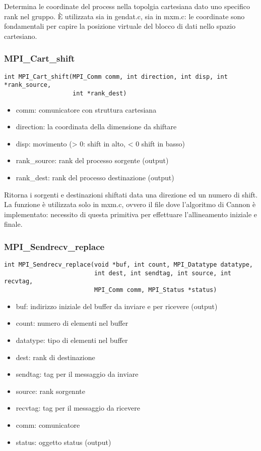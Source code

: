 Determina le coordinate del process nella topolgia cartesiana dato uno specifico rank nel gruppo. \`{E} utilizzata sia in gendat.c, sia in mxm.c: le coordinate sono fondamentali per capire la posizione virtuale del blocco di dati nello spazio cartesiano.

\subsubsection{MPI\_Cart\_shift}
\begin{lstlisting}
int MPI_Cart_shift(MPI_Comm comm, int direction, int disp, int *rank_source,
                   int *rank_dest)
\end{lstlisting}
\begin{itemize}
  \item comm: comunicatore con struttura cartesiana
  \item direction: la coordinata della dimensione da shiftare
  \item disp: movimento (> 0: shift in alto, < 0 shift in basso)
  \item rank\_source: rank del processo sorgente (output)
  \item rank\_dest: rank del processo destinazione (output)
\end{itemize}

Ritorna i sorgenti e destinazioni shiftati data una direzione ed un numero di shift. La funzione \`{e} utilizzata solo in mxm.c, ovvero il file dove l'algoritmo di Cannon \`{e} implementato: necessito di questa primitiva per effettuare l'allineamento iniziale e finale.

\subsubsection{MPI\_Sendrecv\_replace}
\begin{lstlisting}
int MPI_Sendrecv_replace(void *buf, int count, MPI_Datatype datatype,
                         int dest, int sendtag, int source, int recvtag,
                         MPI_Comm comm, MPI_Status *status)
\end{lstlisting}
\begin{itemize}
  \item buf: indirizzo iniziale del buffer da inviare e per ricevere (output)
  \item count: numero di elementi nel buffer
  \item datatype: tipo di elementi nel buffer
  \item dest: rank di destinazione
  \item sendtag: tag per il messaggio da inviare
  \item source: rank sorgennte
  \item recvtag: tag per il messaggio da ricevere
  \item comm: comunicatore
  \item status: oggetto status (output)
\end{itemize}

